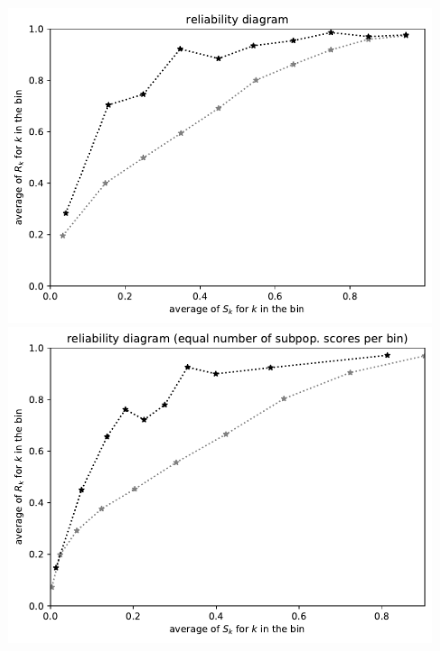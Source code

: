 \documentclass{article}
\begin{document}
\begin{figure}
\begin{centering}
\vspace{\vertsep}

\parbox{\imsize}{\includegraphics[width=\imsize]
                 {./codes/unweighted/50000_5000_10_0/equiscore.pdf}}
\quad\quad
\parbox{\imsize}{\includegraphics[width=\imsize]
                 {./codes/unweighted/50000_5000_10_0/equisamps.pdf}}

\vspace{\vertsep}


\end{centering}
\end{figure}
\end{document}
